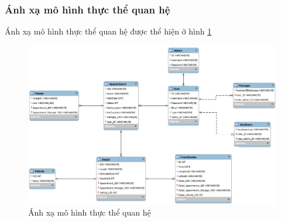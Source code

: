 \documentclass[a4paper]{article}
\begin{document}
\subsubsection{Ánh xạ mô hình thực thể quan hệ}
Ánh xạ mô hình thực thể quan hệ được thể hiện ở hình \ref{fig:erd2}
\begin{figure}
    \includegraphics[scale=0.7]{erd2}
    \caption{Ánh xạ mô hình thực thể quan hệ}
    \label{fig:erd2}
\end{figure}
\clearpage
\end{document}
